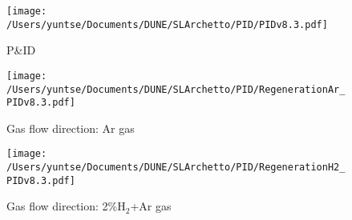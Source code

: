 \documentclass[letterpaper,11pt]{article}
\newcommand{\Hydro}     {H$_2$}
\begin{document}
\clearpage
\begin{figure}[htb]
\begin{center}
\texttt{[image: /Users/yuntse/Documents/DUNE/SLArchetto/PID/PIDv8.3.pdf]}
\caption{P\&ID}
\end{center}
\end{figure}
\clearpage
\begin{figure}[htb]
\begin{center}
\texttt{[image: /Users/yuntse/Documents/DUNE/SLArchetto/PID/RegenerationAr\_PIDv8.3.pdf]}
\caption{Gas flow direction: Ar gas}
\end{center}
\end{figure}
\clearpage
\begin{figure}[htb]
\begin{center}
\texttt{[image: /Users/yuntse/Documents/DUNE/SLArchetto/PID/RegenerationH2\_PIDv8.3.pdf]}
\caption{Gas flow direction: 2\%{\Hydro}+Ar gas}
\end{center}
\end{figure}
\end{document}
